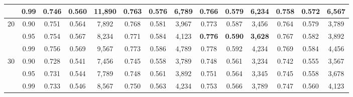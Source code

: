 \documentclass[journal]{IEEEtran}
\begin{document}
\begin{table}[t]
\begin{tabular}{cccccccccccccc}
                            & 0.99                & 0.746                                  & 0.560                                  & 11,890                                  & 0.763                                   & 0.576 & 6,789    & 0.766          & 0.579          & 6,234          & 0.758 & 0.572 & 6,567    \\
        \midrule
        \multirow{3}{*}{20} & 0.90                & 0.751                                  & 0.564                                  & 7,892                                   & 0.768                                   & 0.581 & 3,967    & 0.773          & 0.587          & 3,456          & 0.764 & 0.579 & 3,789    \\
                            & 0.95                & 0.754                                  & 0.567                                  & 8,234                                   & 0.771                                   & 0.584 & 4,123    & \textbf{0.776} & \textbf{0.590} & \textbf{3,628} & 0.767 & 0.582 & 3,892    \\
                            & 0.99                & 0.756                                  & 0.569                                  & 9,567                                   & 0.773                                   & 0.586 & 4,789    & 0.778          & 0.592          & 4,234          & 0.769 & 0.584 & 4,456    \\
        \midrule
        \multirow{3}{*}{30} & 0.90                & 0.728                                  & 0.541                                  & 7,456                                   & 0.745                                   & 0.558 & 3,789    & 0.748          & 0.561          & 3,234          & 0.742 & 0.555 & 3,567    \\
                            & 0.95                & 0.731                                  & 0.544                                  & 7,789                                   & 0.748                                   & 0.561 & 3,892    & 0.751          & 0.564          & 3,345          & 0.745 & 0.558 & 3,678    \\
                            & 0.99                & 0.733                                  & 0.546                                  & 8,567                                   & 0.750                                   & 0.563 & 4,234    & 0.753          & 0.566          & 3,789          & 0.747 & 0.560 & 4,123    \\
        \bottomrule
    \end{tabular}
\end{table}
\end{document}
